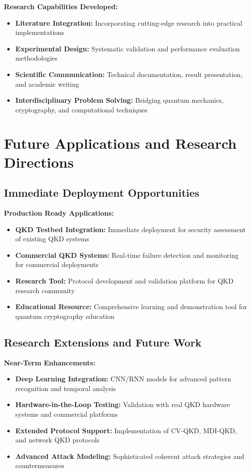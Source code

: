 \documentclass[12pt,a4paper]{article}
\begin{document}
\textbf{Research Capabilities Developed:}
\begin{itemize}
    \item \textbf{Literature Integration:} Incorporating cutting-edge research into practical implementations
    \item \textbf{Experimental Design:} Systematic validation and performance evaluation methodologies
    \item \textbf{Scientific Communication:} Technical documentation, result presentation, and academic writing
    \item \textbf{Interdisciplinary Problem Solving:} Bridging quantum mechanics, cryptography, and computational techniques
\end{itemize}

\section{Future Applications and Research Directions}

\subsection{Immediate Deployment Opportunities}

\textbf{Production Ready Applications:}
\begin{itemize}
    \item \textbf{QKD Testbed Integration:} Immediate deployment for security assessment of existing QKD systems
    \item \textbf{Commercial QKD Systems:} Real-time failure detection and monitoring for commercial deployments
    \item \textbf{Research Tool:} Protocol development and validation platform for QKD research community
    \item \textbf{Educational Resource:} Comprehensive learning and demonstration tool for quantum cryptography education
\end{itemize}

\subsection{Research Extensions and Future Work}

\textbf{Near-Term Enhancements:}
\begin{itemize}
    \item \textbf{Deep Learning Integration:} CNN/RNN models for advanced pattern recognition and temporal analysis
    \item \textbf{Hardware-in-the-Loop Testing:} Validation with real QKD hardware systems and commercial platforms
    \item \textbf{Extended Protocol Support:} Implementation of CV-QKD, MDI-QKD, and network QKD protocols
    \item \textbf{Advanced Attack Modeling:} Sophisticated coherent attack strategies and countermeasures
\end{itemize}
\end{document}
